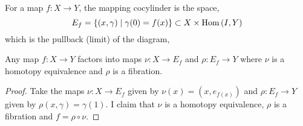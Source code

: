 \documentclass[12pt]{extarticle}
\begin{document}
\begin{definition}
For a map $f : X \to Y$, the mapping cocylinder is the space,
\[ E_f  = \{(x, \gamma) \mid \gamma(0) = f(x) \} \subset X \times \mathrm{Hom}\left( I, Y \right) \]
which is the pullback (limit) of the diagram,
\begin{center}
\end{center}  
\end{definition}

\begin{lemma}
Any map $f : X \to Y$ factors into maps $\nu : X \to E_f$ and $\rho : E_f \to Y$ where $\nu$ is a homotopy equivalence and $\rho$ is a fibration.
\end{lemma}

\begin{proof}
Take the maps $\nu : X \to E_f$ given by $\nu(x) = (x, e_{f(x)})$ and $\rho : E_f \to Y$ given by $\rho(x, \gamma) = \gamma(1)$. I claim that $\nu$ is a homotopy equivalence, $\rho$ is a fibration and $f = \rho \circ \nu$. 
\end{proof}
\end{document}
